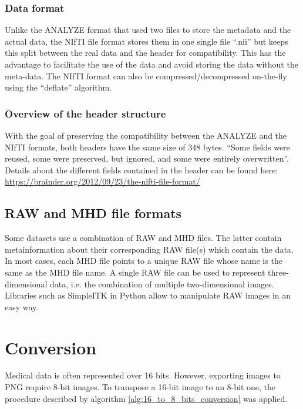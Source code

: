 \subsubsection{Data format}
Unlike the ANALYZE format that used two files to store the metadata and the actual data, the NIfTI file format stores them in one single file “.nii” but keeps this split between the real data and the header for compatibility. This has the advantage to facilitate the use of the data and avoid storing the data without the meta-data. The NIfTI format can also be compressed/decompressed on-the-fly using the “deflate”  algorithm.


\subsubsection{Overview of the header structure}
With the goal of preserving the compatibility between the ANALYZE and the NIfTI formats, both headers have the same size of 348 bytes. “Some fields were reused, some were preserved, but ignored, and some were entirely overwritten”. Details about the different fields contained in the header can be found here: \url{https://brainder.org/2012/09/23/the-nifti-file-format/}


\subsection{RAW and MHD file formats}

Some datasets use a combination of RAW and MHD files. The latter contain metainformation about their corresponding RAW file(s) which contain the data. In most cases, each MHD file points to a unique RAW file whose name is the same as the MHD file name. A single RAW file can be used to represent three-dimensional data, i.e. the combination of multiple two-dimensional images. Libraries such as \mbox{SimpleITK} in Python allow to manipulate RAW images in an easy way. 


\section{Conversion}

Medical data is often represented over 16 bits. However, exporting images to PNG require 8-bit images. To transpose a 16-bit image to an 8-bit one, the procedure described by algorithm \ref{alg:16_to_8_bits_conversion} was applied.

